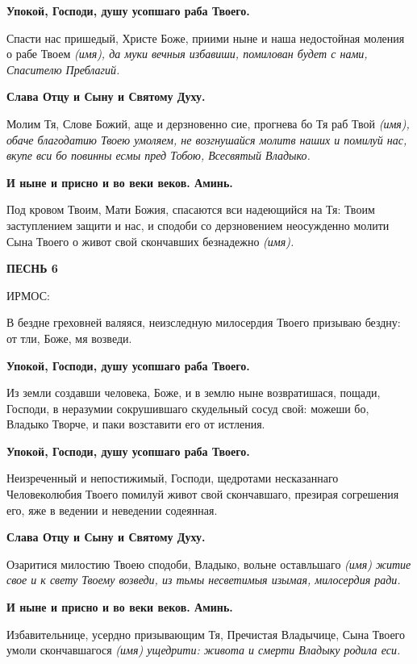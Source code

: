 \bfseries Упокой, Господи, душу усопшаго раба Твоего.\normalfont{}\normalfont{}


Спасти нас пришедый, Христе Боже, приими ныне и наша недостойная моления о рабе Твоем \itshape (имя)\normalfont{}, да муки вечныя избавиши, помилован будет с нами, Спасителю Преблагий.


\bfseries Слава Отцу и Сыну и Святому Духу.\normalfont{}\normalfont{}


Молим Тя, Слове Божий, аще и дерзновенно сие, прогнева бо Тя раб Твой \itshape (имя)\normalfont{}, обаче благодатию Твоею умоляем, не возгнушайся молитв наших и помилуй нас, вкупе вси бо повинны есмы пред Тобою, Всесвятый Владыко.


\bfseries И ныне и присно и во веки веков. Аминь.\normalfont{}\normalfont{}


Под кровом Твоим, Мати Божия, спасаются вси надеющийся на Тя: Твоим заступлением защити и нас, и сподоби со дерзновением неосужденно молити Сына Твоего о живот свой скончавших безнадежно \itshape (имя)\normalfont{}. 


\bfseries ПЕСНЬ 6


ИРМОС:\normalfont{}


В бездне греховней валяяся, неизследную милосердия Твоего призываю бездну: от тли, Боже, мя возведи.


\bfseries Упокой, Господи, душу усопшаго раба Твоего.\normalfont{}\normalfont{}


Из земли создавши человека, Боже, и в землю ныне возвратишася, пощади, Господи, в неразумии сокрушившаго скудельный сосуд свой: можеши бо, Владыко Творче, и паки возставити его от истления.


\bfseries Упокой, Господи, душу усопшаго раба Твоего.\normalfont{}\normalfont{}


Неизреченный и непостижимый, Господи, щедротами несказаннаго Человеколюбия Твоего помилуй живот свой скончавшаго, презирая согрешения его, яже в ведении и неведении содеянная.


\bfseries Слава Отцу и Сыну и Святому Духу.\normalfont{}\normalfont{}


Озаритися милостию Твоею сподоби, Владыко, вольне оставльшаго \itshape (имя)\normalfont{} житие свое и к свету Твоему возведи, из тьмы несветимыя изымая, милосердия ради.


\bfseries И ныне и присно и во веки веков. Аминь.\normalfont{}\normalfont{}


Избавительнице, усердно призывающим Тя, Пречистая Владычице, Сына Твоего умоли скончавшагося \itshape (имя)\normalfont{} ущедрити: живота и смерти Владыку родила еси. 


